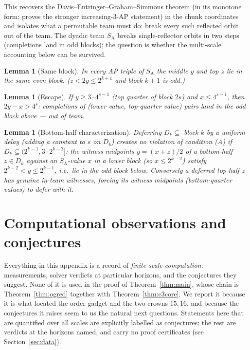\documentclass[11pt]{article}
\newtheorem{lemma}[theorem]{Lemma}
\theoremstyle{definition}
\newcommand{\SA}{S_{\mathrm{A}}}
\begin{document}
\noindent This recovers the Davis--Entringer--Graham--Simmons theorem (in its
monotone form; \cite{DEGS77} proves the stronger increasing-3-AP statement)
in the chunk coordinates and isolates what a permutable team must do: break every
such reflected orbit out of the team. The dyadic team $\SA$ breaks
single-reflector orbits in two steps (completions land in odd blocks); the
question is whether the multi-scale accounting below can be survived.

\begin{lemma}[Same block]\label{lem:sameblock}
In every AP triple of $\SA$ the middle $y$ and top $z$ lie in the same even
block. ($z<2y\le 2^{k+1}$ and block $k{+}1$ is odd.)
\end{lemma}

\begin{lemma}[Escape]\label{lem:escape}
If $y \ge 3\cdot 4^{s-1}$ (top quarter of block $2s$) and $x \le 4^{s-1}$,
then $2y-x > 4^{s}$: completions of (lower value, top-quarter value) pairs
land in the odd block above --- out of team.
\end{lemma}

\begin{lemma}[Bottom-half characterization]\label{lem:bottomhalf}
Deferring $D_k \subseteq$ block $k$ by a uniform delay (adding a constant to
$s$ on $D_k$) creates no violation of condition (A) if
$D_k \subseteq (2^{k-1}, 3\cdot 2^{k-2}]$: the witness midpoints
$y=(x+z)/2$ of a bottom-half $z \in D_k$ against an $\SA$-value $x$ in a
lower block (so $x \le 2^{k-2}$) satisfy
$2^{k-2} < y \le 2^{k-1}$, i.e.\ lie in the odd block below. Conversely a
deferred top-half $z$ has genuine in-team witnesses, forcing its witness
midpoints (bottom-quarter values) to defer with it.
\end{lemma}

\section{Computational observations and conjectures}\label{sec:compobs}

Everything in this appendix is a record of \emph{finite-scale computation}:
measurements, solver verdicts at particular horizons, and the conjectures
they suggest. None of it is used in the proof of Theorem~\ref{thm:main},
whose chain is Theorem~\ref{thm:ogred} together with
Theorem~\ref{thm:c3core}. We report it because it is what located the
order gadget and the two crowns $15, 16$, and because the conjectures it
raises seem to us the natural next questions. Statements here that are
quantified over all scales are explicitly labelled as conjectures; the
rest are verdicts at the horizons named, and carry no proof certificates
(see Section~\ref{sec:data}).
\end{document}
